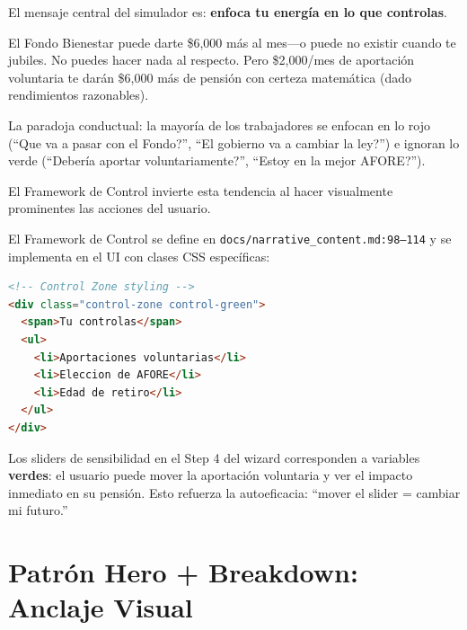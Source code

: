 \documentclass[11pt,a4paper]{report}
\begin{document}
\begin{tcolorbox}[colback=green!5!white, colframe=green!50!black, title=\textbf{Intuici\'on: Enfocarte en lo Verde}]
El mensaje central del simulador es: \textbf{enfoca tu energ\'ia en lo que controlas}.

El Fondo Bienestar puede darte \$6,000 m\'as al mes---o puede no existir cuando te jubiles. No puedes hacer nada al respecto. Pero \$2,000/mes de aportaci\'on voluntaria te dar\'an \$6,000 m\'as de pensi\'on con certeza matem\'atica (dado rendimientos razonables).

La paradoja conductual: la mayor\'ia de los trabajadores se enfocan en lo rojo (``Que va a pasar con el Fondo?'', ``El gobierno va a cambiar la ley?'') e ignoran lo verde (``Deber\'ia aportar voluntariamente?'', ``Estoy en la mejor AFORE?'').

El Framework de Control invierte esta tendencia al hacer visualmente prominentes las acciones del usuario.
\end{tcolorbox}

\begin{tcolorbox}[colback=orange!5!white, colframe=orange!75!black, title=\textbf{Aplicaci\'on en C\'odigo: Control Framework en docs/narrative\_content.md}]
El Framework de Control se define en \texttt{docs/narrative\_content.md:98--114} y se implementa en el UI con clases CSS espec\'ificas:

\begin{lstlisting}[language=HTML]
<!-- Control Zone styling -->
<div class="control-zone control-green">
  <span>Tu controlas</span>
  <ul>
    <li>Aportaciones voluntarias</li>
    <li>Eleccion de AFORE</li>
    <li>Edad de retiro</li>
  </ul>
</div>
\end{lstlisting}

Los sliders de sensibilidad en el Step 4 del wizard corresponden a variables \textbf{verdes}: el usuario puede mover la aportaci\'on voluntaria y ver el impacto inmediato en su pensi\'on. Esto refuerza la autoeficacia: ``mover el slider = cambiar mi futuro.''
\end{tcolorbox}


\section{Patr\'on Hero + Breakdown: Anclaje Visual}
\end{document}
